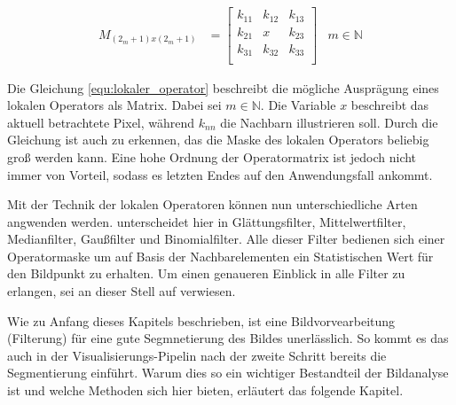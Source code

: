 \begin{align}
	\label{equ:lokaler_operator}M_{(2_m+1)x(2_m+1)} & = \begin{bmatrix}k_{11}&k_{12}&k_{13}\\ k_{21}&x&k_{23}\\ k_{31}&k_{32}&k_{33}\\\end{bmatrix} & m \in \mathbb{N}
\end{align}

Die Gleichung \ref{equ:lokaler_operator} beschreibt die mögliche Ausprägung eines
lokalen Operators als Matrix. Dabei sei $m \in \mathbb{N}$. Die Variable $x$ beschreibt
das aktuell betrachtete Pixel, während $k_{nn}$ die Nachbarn illustrieren soll. Durch
die Gleichung ist auch zu erkennen, das die Maske des lokalen Operators beliebig
groß werden kann. Eine hohe Ordnung der Operatormatrix ist jedoch nicht immer von
Vorteil, sodass es letzten Endes auf den Anwendungsfall ankommt.

Mit der Technik der lokalen Operatoren können nun unterschiedliche Arten
angwenden werden. \citet[Seite 54 - 55]{handels2000} unterscheidet hier in Glättungsfilter,
Mittelwertfilter, Medianfilter, Gaußfilter und Binomialfilter. Alle dieser Filter
bedienen sich einer Operatormaske um auf Basis der Nachbarelementen ein Statistischen
Wert für den Bildpunkt zu erhalten. Um einen genaueren Einblick in alle Filter
zu erlangen, sei an dieser Stell auf \citet[Seite 54 - 55]{handels2000} verwiesen.

Wie zu Anfang dieses Kapitels beschrieben, ist eine Bildvorvearbeitung (Filterung)
für eine gute Segmnetierung des Bildes unerlässlich. So kommt es das auch in der
Visualisierungs-Pipelin nach \citet[Seite 50]{handels2000} der zweite Schritt bereits
die Segmentierung einführt. Warum dies so ein wichtiger Bestandteil der
Bildanalyse ist und welche Methoden sich hier bieten, erläutert das folgende Kapitel.

\pagebreak

